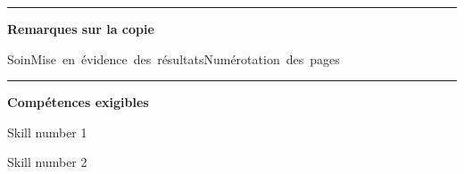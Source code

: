 \documentclass[12pt, a4paper]{article}
\begin{document}
\noindent\rule{\linewidth}{.7pt}\begin{center}{\large\bf Remarques sur la copie}\end{center}

\begin{center}
\noindent \mbox{Soin\xspace\xspace\color{DarkGreen}\faSmileO\color{black}}\hfill \mbox{Mise en évidence des résultats\xspace\xspace\color{DarkGreen}\faSmileO\color{black}}\hfill \mbox{Numérotation des pages\xspace\xspace\color{DarkGreen}\faSmileO\color{black}}\hfill 
\end{center}


\noindent\rule{\linewidth}{.7pt}\begin{center}{\large\bf Compétences exigibles}\end{center}

\begin{minipage}[c]{0.4\linewidth}\centering
Skill number 1\xspace\xspace\color{DarkGreen}\faSmileO\color{black}
\end{minipage}\hfill
\begin{minipage}[c]{0.4\linewidth}\centering
Skill number 2\xspace\xspace\color{DarkRed}\faFrownO\color{black}
\end{minipage}
\end{document}
